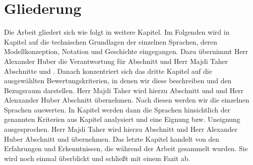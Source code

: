 \section{Gliederung}
\label{sc:Gliederung}
Die Arbeit gliedert sich wie folgt in weitere Kapitel. Im Folgenden wird in Kapitel \pageref{ch:Grundlagen} auf die technischen Grundlagen der einzelnen Sprachen, deren Modellkonzeption, Notation und Geschichte eingegangen. Dazu übernimmt Herr Alexander Huber die Verantwortung für Abschnitt \pageref{sc:SDL} und Herr Majdi Taher Abschnitte \pageref{sc:UML} und \pageref{sc:MSC}. Danach konzentriert sich das dritte Kapitel auf die ausgewählten Bewertungskriterien, in denen wir diese beschreiben und den Bezugsraum darstellen. Herr Majdi Taher wird hierzu Abschnitt \pageref{sc:FormaleKriterien} und \pageref{sc:AnwenderbezogeneKriterien} und Herr Alenxander Huber Abschnitt \pageref{sc:AnwendungsbezogeneKriterien} übernehmen. Nach diesen werden wir die einzelnen Sprachen auswerten. In Kapitel \pageref{ch:Eignung} werden dann die Sprachen hinsichtlich der genannten Kriterien aus Kapitel \pageref{ch:Bewertungskriterien} analysiert und eine Eignung bzw. Uneignung ausgesprochen. Herr Majdi Taher wird hierzu Abschnitt \pageref{sc:UMLB} und Herr Alexander Huber Abschnitt \pageref{sc:SDLB} und \pageref{sc:MSCB} übernehmen.
Das letzte Kapitel \pageref{ch:Fazit} handelt von den Erfahrungen und Erkenntnissen, die während
der Arbeit gesammelt wurden. Sie wird noch einmal überblickt und schließt mit einem Fazit ab.
